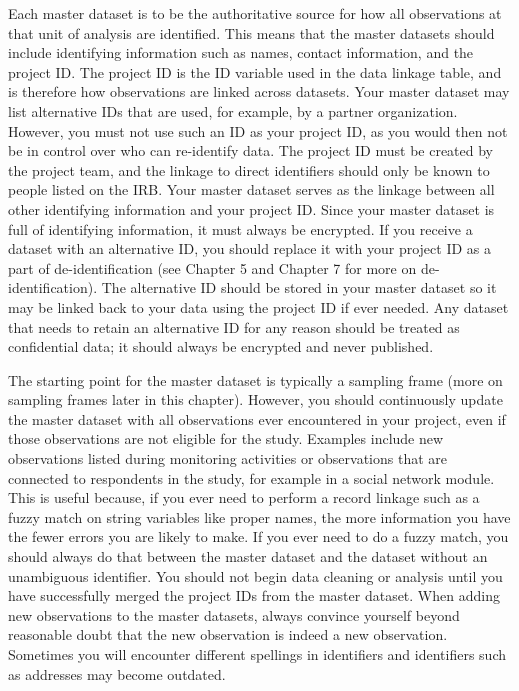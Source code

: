 Each master dataset is to be the authoritative source
for how all observations at that unit of analysis are identified. 
This means that the master datasets should include
identifying information such as names, contact information,
and the project ID.
The project ID is the ID variable used in the data linkage table,
and is therefore how observations are linked across datasets.
Your master dataset may list alternative IDs that are used,
for example, by a partner organization.
However, you must not use such an ID as your project ID,
as you would then not be in control over
who can re-identify data.
The project ID must be created by the project team,
and the linkage to direct identifiers
should only be known to people listed on the IRB.
Your master dataset serves as the linkage between
all other identifying information and your project ID.
Since your master dataset is full of identifying information,
it must always be encrypted.
If you receive a dataset with an alternative ID,
you should replace it with your project ID as a part of de-identification 
(see Chapter 5 and Chapter 7 for more on de-identification).
The alternative ID should be stored in your master dataset
so it may be linked back to your data using the project ID if ever needed.
Any dataset that needs to retain an alternative ID for any reason
should be treated as confidential data; 
it should always be encrypted and never published.

The starting point for the master dataset is typically a sampling frame
(more on sampling frames later in this chapter).
However, you should continuously update the master dataset with
all observations ever encountered in your project,
even if those observations are not eligible for the study.
Examples include new observations listed during monitoring activities
or observations that are connected to respondents in the study,
for example in a social network module.
This is useful because,
if you ever need to perform a record linkage such as a fuzzy match
on string variables like proper names,
the more information you have the fewer errors you are likely to make.
If you ever need to do a fuzzy match,
you should always do that between the master dataset
and the dataset without an unambiguous identifier.
You should not begin data cleaning or analysis until you have successfully merged
the project IDs from the master dataset.
When adding new observations to the master datasets,
always convince yourself beyond reasonable doubt
that the new observation is indeed a new observation.
Sometimes you will encounter different spellings in identifiers
and identifiers such as addresses may become outdated.



